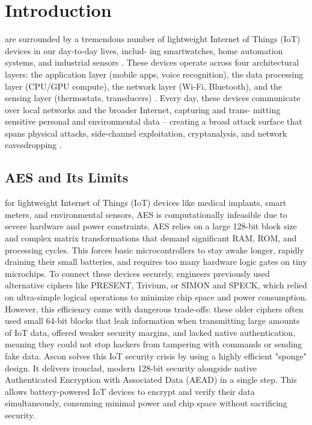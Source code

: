 %

\section{Introduction}

 are surrounded by a tremendous number of lightweight
Internet of Things (IoT) devices in our day-to-day lives, includ-
ing smartwatches, home automation systems, and industrial
sensors . These devices operate across four architectural
layers: the application layer (mobile apps, voice recognition),
the data processing layer (CPU/GPU compute), the network
layer (Wi-Fi, Bluetooth), and the sensing layer (thermostats,
transducers) . Every day, these devices communicate over
local networks and the broader Internet, capturing and trans-
mitting sensitive personal and environmental data – creating a
broad attack surface that spans physical attacks, side-channel
exploitation, cryptanalysis, and network eavesdropping .

\subsection{AES and Its Limits}

 for lightweight Internet of Things (IoT) devices like medical implants, smart meters, and environmental sensors, AES is computationally infeasible due to severe hardware and power constraints. AES relies on a large 128-bit block size and complex matrix transformations that demand significant RAM, ROM, and processing cycles. This forces basic microcontrollers to stay awake longer, rapidly draining their small batteries, and requires too many hardware logic gates on tiny microchips. To connect these devices securely, engineers previously used alternative ciphers like PRESENT, Trivium, or SIMON and SPECK, which relied on ultra-simple logical operations to minimize chip space and power consumption. However, this efficiency came with dangerous trade-offs: these older ciphers often used small 64-bit blocks that leak information when transmitting large amounts of IoT data, offered weaker security margins, and lacked native authentication, meaning they could not stop hackers from tampering with commands or sending fake data. Ascon solves this IoT security crisis by using a highly efficient "sponge" design. It delivers ironclad, modern 128-bit security alongside native Authenticated Encryption with Associated Data (AEAD) in a single step. This allows battery-powered IoT devices to encrypt and verify their data simultaneously, consuming minimal power and chip space without sacrificing security.




